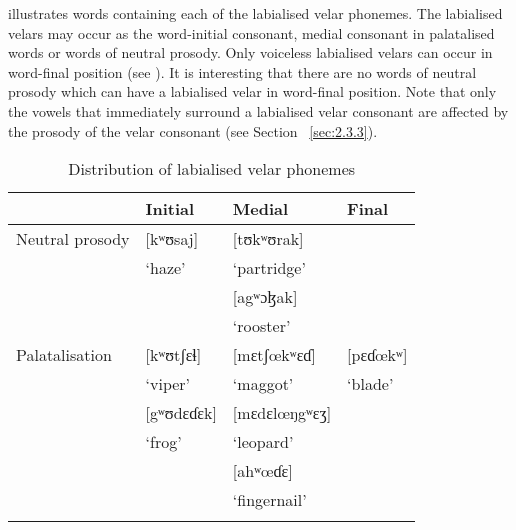\begin{table}
\caption{Minimal pairs for word-level labialised prosody vs. labialised consonant\label{tab:2.4}}
\end{table}

 illustrates words containing each of the labialised velar phonemes. The labialised velars may occur as the word-initial consonant, medial consonant in palatalised words or words of neutral prosody. Only voiceless labialised velars can occur in word-final position (see ). It is interesting that there are no words of neutral prosody which can have a labialised velar in word-final position. Note that only the vowels that immediately surround a labialised velar consonant are affected by the prosody of the velar consonant (see Section~ \ref{sec:2.3.3}).

\begin{table}
\begin{tabular}{llll} 
\lsptoprule
& {Initial} & {Medial} & {Final}\\
\midrule
{Neutral prosody} & [kʷʊsaj]      & [tʊkʷʊrak]     \\
& ‘haze’ & ‘partridge’ &\\
& & [agʷɔɮak]       & \\
& & ‘rooster’ &\\
{Palatalisation} & [kʷʊtʃɛɬ]      & [mɛtʃœkʷɛɗ]   & [pɛɗœkʷ]       \\
& ‘viper’ & ‘maggot’ & ‘blade’\\
& [gʷʊdɛɗɛk]  & {}[mɛdɛlœŋgʷɛʒ]  & \\
& ‘frog’ & ‘leopard’ & \\
& & [ahʷœɗɛ]       & \\
& & ‘fingernail’ & \\
\lspbottomrule
\end{tabular}
\caption{Distribution of labialised velar phonemes\label{tab:2.5}}
\end{table}


